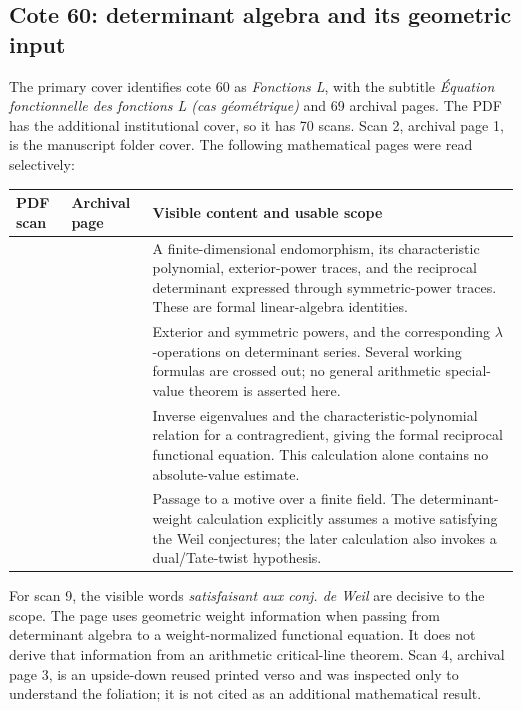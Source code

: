 \documentclass[11pt,a4paper]{article}
\theoremstyle{definition}
\begin{document}
\subsection{Cote 60: determinant algebra and its geometric input}

The primary cover identifies cote 60 as \emph{Fonctions L}, with the
subtitle \emph{\'Equation fonctionnelle des fonctions L (cas g\'eom\'etrique)}
and 69 archival pages.  The PDF has the additional institutional cover,
so it has 70 scans.  Scan 2, archival page 1, is the manuscript folder
cover.  The following mathematical pages were read selectively:

\begin{center}
\begin{tabular}{>{\raggedright\arraybackslash}p{}>{\raggedright\arraybackslash}p{}>{\raggedright\arraybackslash}p{}}
\toprule
PDF scan & Archival page & Visible content and usable scope \\
\midrule
3 & 2 & A finite-dimensional endomorphism, its characteristic polynomial,
exterior-power traces, and the reciprocal determinant expressed through
symmetric-power traces.  These are formal linear-algebra identities. \\
5 & 4 & Exterior and symmetric powers, and the corresponding
\(\lambda\)-operations on determinant series.  Several working formulas
are crossed out; no general arithmetic special-value theorem is asserted
here. \\
7 & 6 & Inverse eigenvalues and the characteristic-polynomial relation
for a contragredient, giving the formal reciprocal functional equation.
This calculation alone contains no absolute-value estimate. \\
9 & 8 & Passage to a motive over a finite field.  The determinant-weight
calculation explicitly assumes a motive satisfying the Weil conjectures;
the later calculation also invokes a dual/Tate-twist hypothesis. \\
\bottomrule
\end{tabular}
\end{center}

For scan 9, the visible words \emph{satisfaisant aux conj. de Weil} are
decisive to the scope.  The page uses geometric weight information when
passing from determinant algebra to a weight-normalized functional
equation.  It does not derive that information from an arithmetic
critical-line theorem.  Scan 4, archival page 3, is an upside-down reused
printed verso and was inspected only to understand the foliation; it is
not cited as an additional mathematical result.
\end{document}
